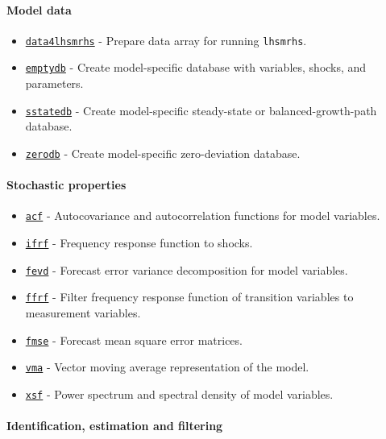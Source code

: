 \paragraph{Model data}\label{model-data}

\begin{itemize}
\itemsep1pt\parskip0pt
\item
  \href{model/data4lhsmrhs}{\texttt{data4lhsmrhs}} - Prepare data array
  for running \texttt{lhsmrhs}.
\item
  \href{model/emptydb}{\texttt{emptydb}} - Create model-specific
  database with variables, shocks, and parameters.
\item
  \href{model/sstatedb}{\texttt{sstatedb}} - Create model-specific
  steady-state or balanced-growth-path database.
\item
  \href{model/zerodb}{\texttt{zerodb}} - Create model-specific
  zero-deviation database.
\end{itemize}

\paragraph{Stochastic properties}\label{stochastic-properties}

\begin{itemize}
\itemsep1pt\parskip0pt
\item
  \href{model/acf}{\texttt{acf}} - Autocovariance and autocorrelation
  functions for model variables.
\item
  \href{model/ifrf}{\texttt{ifrf}} - Frequency response function to
  shocks.
\item
  \href{model/fevd}{\texttt{fevd}} - Forecast error variance
  decomposition for model variables.
\item
  \href{model/ffrf}{\texttt{ffrf}} - Filter frequency response function
  of transition variables to measurement variables.
\item
  \href{model/fmse}{\texttt{fmse}} - Forecast mean square error
  matrices.
\item
  \href{model/vma}{\texttt{vma}} - Vector moving average representation
  of the model.
\item
  \href{model/xsf}{\texttt{xsf}} - Power spectrum and spectral density
  of model variables.
\end{itemize}

\paragraph{Identification, estimation and
filtering}\label{identification-estimation-and-filtering}

